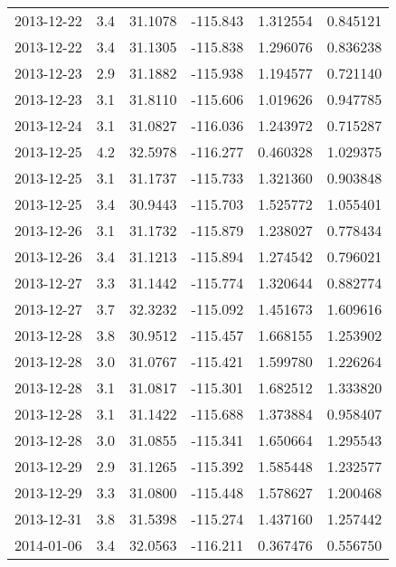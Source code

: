 \begin{tabular}{lrrrrr}
2013-12-22 &       3.4 &  31.1078 &  -115.843 &         1.312554 &         0.845121 \\
2013-12-22 &       3.4 &  31.1305 &  -115.838 &         1.296076 &         0.836238 \\
2013-12-23 &       2.9 &  31.1882 &  -115.938 &         1.194577 &         0.721140 \\
2013-12-23 &       3.1 &  31.8110 &  -115.606 &         1.019626 &         0.947785 \\
2013-12-24 &       3.1 &  31.0827 &  -116.036 &         1.243972 &         0.715287 \\
2013-12-25 &       4.2 &  32.5978 &  -116.277 &         0.460328 &         1.029375 \\
2013-12-25 &       3.1 &  31.1737 &  -115.733 &         1.321360 &         0.903848 \\
2013-12-25 &       3.4 &  30.9443 &  -115.703 &         1.525772 &         1.055401 \\
2013-12-26 &       3.1 &  31.1732 &  -115.879 &         1.238027 &         0.778434 \\
2013-12-26 &       3.4 &  31.1213 &  -115.894 &         1.274542 &         0.796021 \\
2013-12-27 &       3.3 &  31.1442 &  -115.774 &         1.320644 &         0.882774 \\
2013-12-27 &       3.7 &  32.3232 &  -115.092 &         1.451673 &         1.609616 \\
2013-12-28 &       3.8 &  30.9512 &  -115.457 &         1.668155 &         1.253902 \\
2013-12-28 &       3.0 &  31.0767 &  -115.421 &         1.599780 &         1.226264 \\
2013-12-28 &       3.1 &  31.0817 &  -115.301 &         1.682512 &         1.333820 \\
2013-12-28 &       3.1 &  31.1422 &  -115.688 &         1.373884 &         0.958407 \\
2013-12-28 &       3.0 &  31.0855 &  -115.341 &         1.650664 &         1.295543 \\
2013-12-29 &       2.9 &  31.1265 &  -115.392 &         1.585448 &         1.232577 \\
2013-12-29 &       3.3 &  31.0800 &  -115.448 &         1.578627 &         1.200468 \\
2013-12-31 &       3.8 &  31.5398 &  -115.274 &         1.437160 &         1.257442 \\
2014-01-06 &       3.4 &  32.0563 &  -116.211 &         0.367476 &         0.556750 \\

\end{tabular}
